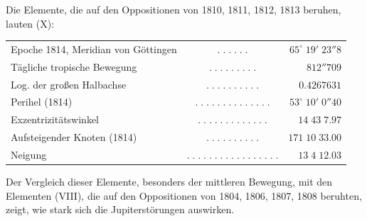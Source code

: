 \par\indent Die Elemente, die auf den Oppositionen von 1810, 1811, 1812, 1813 beruhen, lauten (X):
\begin{center}\fontsize{9}{11}\selectfont\setlength{\tabcolsep}{2pt}\renewcommand{\arraystretch}{1.15}\begin{tabular}{lcr}
Epoche 1814, Meridian von Göttingen & $.\;.\;.\;.\;.\;.$ & $65^\circ\;19'\;23''8$\\
Tägliche tropische Bewegung & $.\;.\;.\;.\;.\;.\;.\;.\;.$ & $812''709$\\
Log. der großen Halbachse & $.\;.\;.\;.\;.\;.\;.\;.\;.\;.$ & $0.4267631$\\
Perihel (1814) & $.\;.\;.\;.\;.\;.\;.\;.\;.\;.\;.\;.\;.\;.$ & $53^\circ\;10'\;0''40$\\
Exzentrizitätswinkel & $.\;.\;.\;.\;.\;.\;.\;.\;.\;.\;.\;.\;.$ & $14\;43\;7.97$\\
Aufsteigender Knoten (1814) & $.\;.\;.\;.\;.\;.\;.\;.\;.\;.$ & $171\;10\;33.00$\\
Neigung & $.\;.\;.\;.\;.\;.\;.\;.\;.\;.\;.\;.\;.\;.\;.\;.\;.$ & $13\;4\;12.03$\\
\end{tabular}\end{center}
\par\indent Der Vergleich dieser Elemente, besonders der mittleren Bewegung, mit den Elementen (VIII), die auf den Oppositionen von 1804, 1806, 1807, 1808 beruhten, zeigt, wie stark sich die Jupiterstörungen auswirken.

